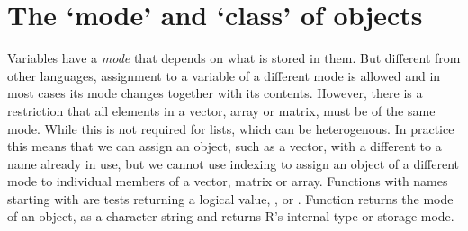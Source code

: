 \documentclass[krantz2]{krantz}\usepackage{knitr}
\begin{document}
\section{The `mode' and `class' of objects}\label{sec:rlang:mode}
Variables have a \emph{mode} that depends on what is stored in them. But different from other languages, assignment to a variable of a different mode is allowed and in most cases its mode changes together with its contents. However, there is a restriction that all elements in a vector, array or matrix, must be of the same mode. While this is not required for lists, which can be heterogenous. In practice this means that we can assign an object, such as a vector, with a different  to a name already in use, but we cannot use indexing to assign an object of a different mode to individual members of a vector, matrix or array. Functions with names starting with  are tests returning a logical value, ,  or . Function  returns the mode of an object, as a character string and  returns R's internal type or storage mode.
\end{document}

